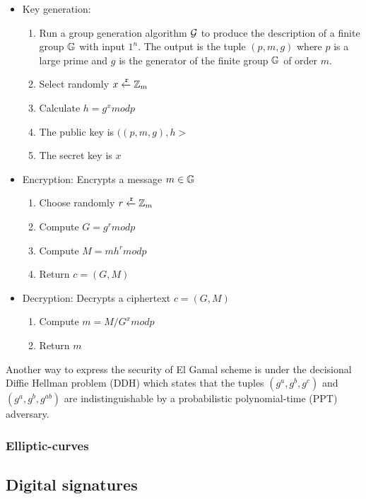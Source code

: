 \begin{itemize}
  \item Key generation:
    \begin{enumerate}
        \item Run a group generation algorithm $\mathcal{G}$ to produce the description of a finite group $\mathbb{G}$ with input $1^{n}$. The output is the tuple $(p, m, g)$ where $p$ is a large prime and $g$ is the generator of the finite group $\mathbb{G}$ of order $m$.
        \item Select randomly $x \xleftarrow{\mathtt{r}}{\mathbb{Z}_m}$
        \item Calculate $h = g^{x}modp$
        \item The public key is $((p, m, g), h>$
        \item The secret key is $x$
    \end{enumerate}
  \item Encryption: Encrypts a message $m \in \mathbb{G}$
    \begin{enumerate}
      \item Choose randomly $r \xleftarrow{\mathtt{r}}{\mathbb{Z}_m}$
      \item Compute $G = g^{r}modp$
      \item Compute $M = mh^{r}modp$
      \item Return $c = (G, M)$
    \end{enumerate}
  \item Decryption: Decrypts a ciphertext $c = (G, M)$
    \begin{enumerate}
      \item Compute $m = M / G^{x} modp$
      \item Return $m$
    \end{enumerate}
\end{itemize}

Another way to express the security of El Gamal scheme is under the decisional Diffie Hellman problem (DDH) which states that the tuples $(g^a, g^b, g^c)$ and $(g^a, g^b, g^{ab})$ are indistinguishable by a probabilistic polynomial-time (PPT) adversary.

\subsubsection{Elliptic-curves}
\label{preliminaries:crypto_block:pub:el_curves}

\subsection{Digital signatures}
\label{preliminaries:crypto_block:sign}

